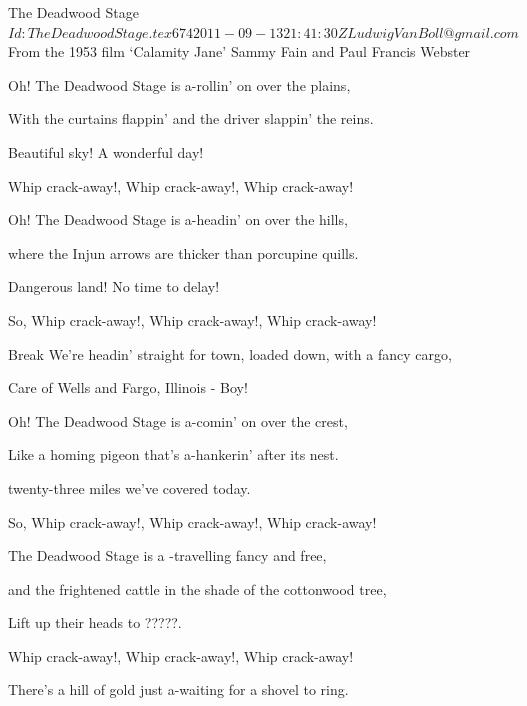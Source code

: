\begin{SBSong}{The Deadwood Stage}
  {$Id: TheDeadwoodStage.tex 674 2011-09-13 21:41:30Z LudwigVanBoll@gmail.com $}
  {From the 1953 film `Calamity Jane'}
  {Sammy Fain and Paul Francis Webster}
  \begin{SBVerse}
    Oh! The Deadwood Stage is a-rollin' on over the plains,
    
    With the curtains flappin' and the driver slappin' the reins.
    
    Beautiful sky! A wonderful day!
    
    Whip crack-away!, Whip crack-away!, Whip crack-away!
  \end{SBVerse}
  \begin{SBVerse}
    Oh! The Deadwood Stage is a-headin' on over the hills,
    
    where the Injun arrows are thicker than porcupine quills.
    
    Dangerous land! No time to delay!
    
    So, Whip crack-away!, Whip crack-away!, Whip crack-away!
  \end{SBVerse}
  \begin{SBBracket}{Break}
    We're headin' straight for town, loaded down, with a fancy cargo,
    
    Care of Wells and Fargo, Illinois - Boy!
  \end{SBBracket}
  \begin{SBVerse}
    Oh! The Deadwood Stage is a-comin' on over the crest,
    
    Like a homing pigeon that's a-hankerin' after its nest.
    
    twenty-three miles we've covered today.
    
    So, Whip crack-away!, Whip crack-away!, Whip crack-away!
  \end{SBVerse}
  \begin{SBVerse}
    The Deadwood Stage is a -travelling fancy and free,
    
    and the frightened cattle in the shade of the cottonwood tree,
    
    Lift up their heads to ?????.
    
    Whip crack-away!, Whip crack-away!, Whip crack-away!
  \end{SBVerse}
  \begin{SBVerse}
    There's a hill of gold just a-waiting for a shovel to ring.
    

\end{SBVerse}
\end{SBSong}
